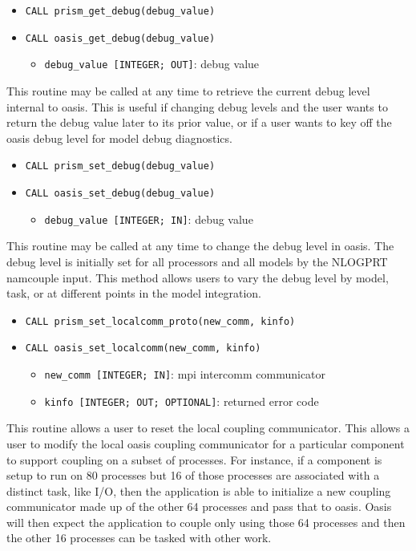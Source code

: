 \begin{itemize} 
\item {\tt CALL prism\_get\_debug(debug\_value)}
\item {\tt CALL oasis\_get\_debug(debug\_value)}
\begin{itemize}
\item {\tt debug\_value [INTEGER; OUT]}: debug value
\end{itemize}
\end{itemize}

This routine may be called at any time to retrieve the current
debug level internal to oasis.  This is useful if changing debug
levels and the user wants to return the debug value later to
its prior value, or if a user wants to key off the oasis
debug level for model debug diagnostics.

\begin{itemize} 
\item {\tt CALL prism\_set\_debug(debug\_value)}
\item {\tt CALL oasis\_set\_debug(debug\_value)}
\begin{itemize}
\item {\tt debug\_value [INTEGER; IN]}: debug value
\end{itemize}
\end{itemize}

This routine may be called at any time to change the debug level in oasis.
The debug level is initially set for all processors and all models
by the NLOGPRT namcouple input.  This method allows users to vary 
the debug level by model, task, or at different points in the model
integration.

\begin{itemize} 
\item {\tt CALL prism\_set\_localcomm\_proto(new\_comm, kinfo)}
\item {\tt CALL oasis\_set\_localcomm(new\_comm, kinfo)}
\begin{itemize}
\item {\tt new\_comm [INTEGER; IN]}: mpi intercomm communicator
\item {\tt kinfo [INTEGER; OUT; OPTIONAL]}: returned error code
\end{itemize}
\end{itemize}

This routine allows a user to reset the local coupling communicator.
This allows a user to modify the local oasis coupling communicator for
a particular component to support coupling on a subset of processes.
For instance, if a component is setup to run on 80 processes but
16 of those processes are associated with a distinct task, like I/O,
then the application is able to initialize a new coupling communicator
made up of the other 64 processes and pass that to oasis.  Oasis will
then expect the application to couple only using those 64 processes
and then the other 16 processes can be tasked with other work.


